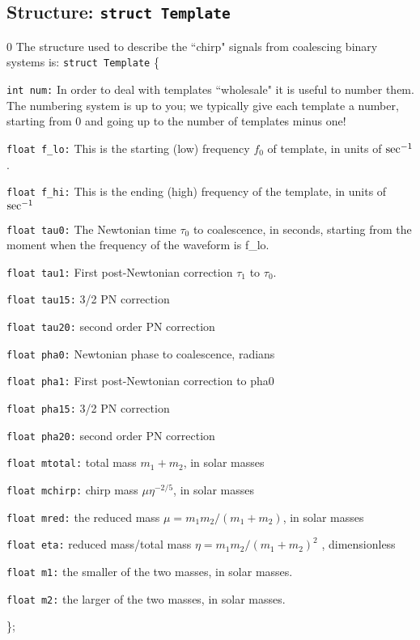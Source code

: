 \subsection{Structure: {\tt struct Template}}
\setcounter{equation}0
The structure used to describe the ``chirp" signals from coalescing
binary systems is:
{\tt struct Template} \{
\begin{description}
\item{\tt int num:}
   In order to deal with templates ``wholesale" it is useful to number
   them.  The numbering system is up to you; we typically give each
   template a number, starting from 0 and going up to the number of
   templates minus one!
\item{\tt float f\_lo:}
   This is the starting (low) frequency $f_0$ of template, in units of ${\rm
   sec}^{-1}$.
\item{\tt float f\_hi:}
   This is the ending (high) frequency of the template, in units of
   ${\rm sec}^{-1}$
\item{\tt float tau0:}
   The Newtonian time $\tau_0$ to coalescence, in seconds, starting from the
   moment when the frequency of the waveform is f\_lo.
\item{\tt float tau1:}
   First post-Newtonian correction $\tau_1$ to $\tau_0$. 
\item{\tt float tau15:}
   3/2 PN correction 
\item{\tt float tau20:}
   second order  PN correction 
\item{\tt float pha0:}
   Newtonian phase to coalescence, radians 
\item{\tt float pha1:}
   First post-Newtonian correction to pha0 
\item{\tt float pha15:}
   3/2 PN correction 
\item{\tt float pha20:}
   second order  PN correction 
\item{\tt float mtotal:}
   total mass $m_1+m_2$, in solar masses 
\item{\tt float mchirp:}
   chirp mass $\mu \eta^{-2/5}$, in solar masses 
\item{\tt float mred:}
   the reduced mass $\mu=m_1 m_2/(m_1+m_2)$, in solar masses 
\item{\tt float eta:}
   reduced mass/total mass $\eta=m_1 m_2/(m_1+m_2)^2$ , dimensionless
\item{\tt float m1:}
   the smaller of the two masses, in solar masses.
\item{\tt float m2:}
   the larger of the two masses, in solar masses.
\end{description}
\};

